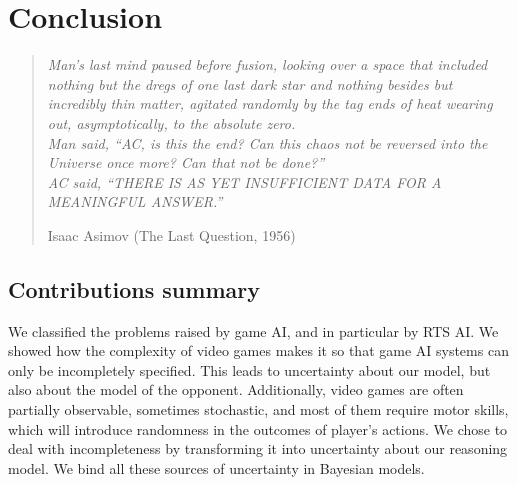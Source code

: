 \chapter{Conclusion}
\begin{quotation}\textit{
Man's last mind paused before fusion, looking over a space that included nothing but the dregs of one last dark star and nothing besides but incredibly thin matter, agitated randomly by the tag ends of heat wearing out, asymptotically, to the absolute zero.\\
Man said, ``AC, is this the end? Can this chaos not be reversed into the Universe once more? Can that not be done?''\\
AC said, ``THERE IS AS YET INSUFFICIENT DATA FOR A MEANINGFUL ANSWER.''
}
\begin{flushright}Isaac Asimov (The Last Question, 1956)\end{flushright}\end{quotation}


\section{Contributions summary}
We classified the problems raised by game AI, and in particular by RTS AI. We showed how the complexity of video games makes it so that game AI systems can only be incompletely specified. This leads to uncertainty about our model, but also about the model of the opponent. Additionally, video games are often partially observable, sometimes stochastic, and most of them require motor skills, which will introduce randomness in the outcomes of player's actions. We chose to deal with incompleteness by transforming it into uncertainty about our reasoning model. We bind all these sources of uncertainty in Bayesian models. 

